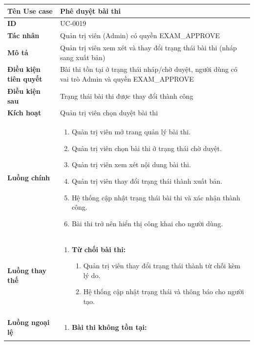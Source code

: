{
\renewcommand{\arraystretch}{1.5}

\begin{tabularx}{\textwidth}{|>{\raggedright\arraybackslash}X|>{\raggedright\arraybackslash}X|}
\hline
\textbf{Tên Use case} & Phê duyệt bài thi \\
\hline
\textbf{ID} & UC-0019 \\
\hline
\textbf{Tác nhân} & Quản trị viên (Admin) có quyền EXAM\_APPROVE \\
\hline
\textbf{Mô tả} & Quản trị viên xem xét và thay đổi trạng thái bài thi (nháp sang xuất bản) \\
\hline
\textbf{Điều kiện tiên quyết} & Bài thi tồn tại ở trạng thái nháp/chờ duyệt, người dùng có vai trò Admin và quyền EXAM\_APPROVE \\
\hline
\textbf{Điều kiện sau} & Trạng thái bài thi được thay đổi thành công \\
\hline
\textbf{Kích hoạt} & Quản trị viên chọn duyệt bài thi \\
\hline
\textbf{Luồng chính} &
\begin{enumerate}
    \item Quản trị viên mở trang quản lý bài thi.
    \item Quản trị viên chọn bài thi ở trạng thái chờ duyệt.
    \item Quản trị viên xem xét nội dung bài thi.
    \item Quản trị viên thay đổi trạng thái thành xuất bản.
    \item Hệ thống cập nhật trạng thái bài thi và xác nhận thành công.
    \item Bài thi trở nên hiển thị công khai cho người dùng.
\end{enumerate} \\
\hline
\textbf{Luồng thay thế} &
\begin{enumerate}
    \item \textbf{Từ chối bài thi:}
    \begin{enumerate}
        \item[4A.] Quản trị viên thay đổi trạng thái thành từ chối kèm lý do.
        \item[5A.] Hệ thống cập nhật trạng thái và thông báo cho người tạo.
    \end{enumerate}
\end{enumerate} \\
\hline
\textbf{Luồng ngoại lệ} &
\begin{enumerate}
    \item \textbf{Bài thi không tồn tại:}

\end{enumerate}
\end{tabularx}}
